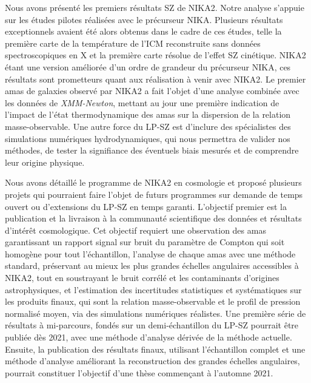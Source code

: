 Nous avons présenté les premiers résultats SZ de NIKA2. Notre analyse s'appuie sur les études pilotes réalisées avec le précurseur NIKA. Plusieurs résultats exceptionnels avaient été alors obtenus dans le cadre de ces études, telle la première carte de la température de l'ICM reconstruite sans données spectroscopiques en X et la première carte résolue de l'effet SZ cinétique. NIKA2 étant une version améliorée d'un ordre de grandeur du précurseur NIKA, ces résultats sont prometteurs quant aux réalisation à venir avec NIKA2. Le premier amas de galaxies observé par NIKA2 a fait l'objet d'une analyse combinée avec les données de \emph{XMM-Newton}, mettant au jour une première indication de l'impact de l'état thermodynamique des amas sur la dispersion de la relation masse-observable. Une autre force du LP-SZ est d'inclure des spécialistes des simulations numériques hydrodynamiques, qui nous permettra de valider nos méthodes, de tester la signifiance des éventuels biais mesurés et de comprendre leur origine physique. 

Nous avons détaillé le programme de NIKA2 en cosmologie et proposé plusieurs projets qui pourraient faire l'objet de futurs programmes sur demande de temps ouvert ou d'extensions du LP-SZ en temps garanti. L'objectif premier est la publication et la livraison à la communauté scientifique des données et résultats d'intérêt cosmologique. Cet objectif requiert une observation des amas garantissant un rapport signal sur bruit du paramètre de Compton qui soit homogène pour tout l'échantillon, l'analyse de chaque amas avec une méthode standard, préservant au mieux les plus grandes échelles angulaires accessibles à NIKA2, tout en soustrayant le bruit corrélé et les contaminants d'origines astrophysiques, et l'estimation des incertitudes statistiques et systématiques sur les produits finaux, qui sont la relation masse-observable et le profil de pression normalisé moyen, via des simulations numériques réalistes. Une première série de résultats à mi-parcours, fondés sur un demi-échantillon du LP-SZ pourrait être publiée dès 2021, avec une méthode d'analyse dérivée de la méthode actuelle. Ensuite, la publication des résultats finaux, utilisant l'échantillon complet et une méthode d'analyse améliorant la reconstruction des grandes échelles angulaires, pourrait constituer l'objectif d'une thèse commençant à l'automne 2021.

